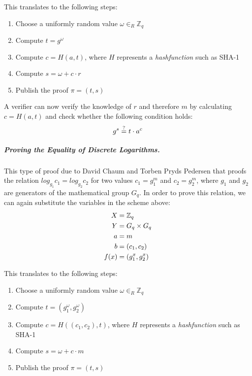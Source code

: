 \documentclass[numbers=noenddot, abstract=on, a4paper, headsepline,
footsepline, oneside, draft=off]{scrreprt}
\begin{document}
This translates to the following steps:

\begin{enumerate}
  \item Choose a uniformly random value $\omega \in_R \mathbb{Z}_q$
  \item Compute $t=g^\omega$
  \item Compute $c=H(a,t)$, where $H$ represents a \textit{hashfunction} such as
  SHA-1
  \item Compute $s=\omega + c \cdot r$
  \item Publish the proof $\pi = (t,s)$
\end{enumerate}

A verifier can now verify the knowledge of $r$ and therefore $m$ by calculating
$c=H(a,t)$ and check whether the following condition holds:
\begin{equation}
	g^s \stackrel{?}{=} t \cdot a^c \notag
\end{equation}

\subparagraph{Proving the Equality of Discrete Logarithms.}
This type of proof due to David Chaum and Torben Pryds Pedersen \cite{CP93}
that proofs the relation $log_{g_1} c_1 = log_{g_2} c_2 $ for two values $c_1 =
g_1^m$ and $c_2 = g_2^m$, where $g_1$ and $g_2$ are generators of the
mathematical group $G_q$. In order to prove this relation, we can again
substitute the variables in the scheme above:
\begin{align}
  X &= \mathbb{Z}_q \notag \\
  Y &= G_q \times G_q \notag \\
  a &=m \notag \\
  b &=(c_1, c_2) \notag \\
  f(x) &= (g_1^x, g_2^x) \notag
\end{align} 

This translates to the following steps:

\begin{enumerate}
  \item Choose a uniformly random value $\omega \in_R \mathbb{Z}_q$
  \item Compute $t=(g_1^\omega, g_2^\omega)$
  \item Compute $c=H((c_1,c_2),t)$, where $H$ represents a \textit{hashfunction}
  such as SHA-1
  \item Compute $s=\omega + c \cdot m$
  \item Publish the proof $\pi = (t,s)$
\end{enumerate}
\end{document}
